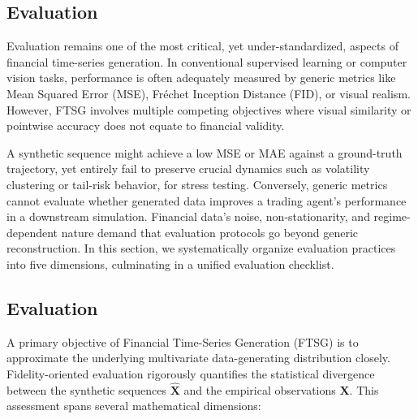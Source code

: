 \subsection{Evaluation}
\label{sec:evaluation}

Evaluation remains one of the most critical, yet under-standardized, aspects of financial time-series generation. In conventional supervised learning or computer vision tasks, performance is often adequately measured by generic metrics like Mean Squared Error (MSE), Fréchet Inception Distance (FID), or visual realism. However, FTSG involves multiple competing objectives where visual similarity or pointwise accuracy does not equate to financial validity.

A synthetic sequence might achieve a low MSE or MAE against a ground-truth trajectory, yet entirely fail to preserve crucial dynamics such as volatility clustering or tail-risk behavior, for stress testing. Conversely, generic metrics cannot evaluate whether generated data improves a trading agent's performance in a downstream simulation. Financial data's noise, non-stationarity, and regime-dependent nature demand that evaluation protocols go beyond generic reconstruction. In this section, we systematically organize evaluation practices into five dimensions, culminating in a unified evaluation checklist.

\subsection{Evaluation}
A primary objective of Financial Time-Series Generation (FTSG) is to approximate the underlying multivariate data-generating distribution closely. Fidelity-oriented evaluation rigorously quantifies the statistical divergence between the synthetic sequences $\hat{\mathbf{X}}$ and the empirical observations $\mathbf{X}$. This assessment spans several mathematical dimensions:


